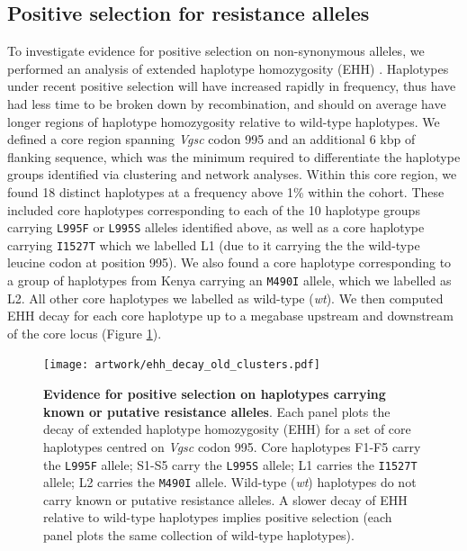 \documentclass[a4paper,11pt,abstracton,hidelinks]{scrartcl}
\begin{document}
\subsection*{Positive selection for resistance alleles}

%

To investigate evidence for positive selection on non-synonymous alleles, we performed an analysis of extended haplotype homozygosity (EHH) \cite{Sabeti2002}.
%
Haplotypes under recent positive selection will have increased rapidly in frequency, thus have had less time to be broken down by recombination, and should on average have longer regions of haplotype homozygosity relative to wild-type haplotypes.
%
We defined a core region spanning \textit{Vgsc} codon 995 and an additional 6 kbp of flanking sequence, which was the minimum required to differentiate the haplotype groups identified via clustering and network analyses.
%
Within this core region, we found 18 distinct haplotypes at a frequency above 1\% within the cohort.
%
These included core haplotypes corresponding to each of the 10 haplotype groups carrying \texttt{L995F} or \texttt{L995S} alleles identified above, as well as a core haplotype carrying \texttt{I1527T} which we labelled L1 (due to it carrying the the wild-type leucine codon at position 995).
%
We also found a core haplotype corresponding to a group of haplotypes from Kenya carrying an \texttt{M490I} allele, which we labelled as L2.
%
All other core haplotypes we labelled as wild-type (\textit{wt}).
%
We then computed EHH decay for each core haplotype up to a megabase upstream and downstream of the core locus (Figure \ref{fig:ehh_decay}).
%


%
\begin{figure}[!t]
  \texttt{[image: artwork/ehh\_decay\_old\_clusters.pdf]}
  \caption{\textbf{Evidence for positive selection on haplotypes carrying known or putative resistance alleles}. Each panel plots the decay of extended haplotype homozygosity (EHH) for a set of core haplotypes centred on \textit{Vgsc} codon 995. Core haplotypes F1-F5 carry the \texttt{L995F} allele; S1-S5 carry the \texttt{L995S} allele; L1 carries the \texttt{I1527T} allele; L2 carries the \texttt{M490I} allele. Wild-type (\textit{wt}) haplotypes do not carry known or putative resistance alleles. A slower decay of EHH relative to wild-type haplotypes implies positive selection (each panel plots the same collection of wild-type haplotypes).}
  \label{fig:ehh_decay}
\end{figure}
\end{document}
